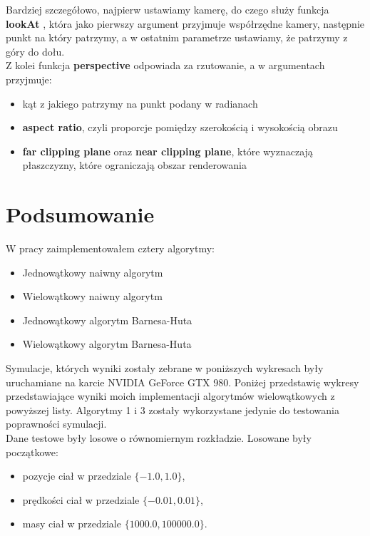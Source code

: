 \documentclass[14pt,twoside,a4paper]{article}
\theoremstyle{definition}
\begin{document}
Bardziej szczegółowo, najpierw ustawiamy kamerę, do czego służy funkcja \textbf{lookAt} \cite{opengl}, która jako pierwszy argument przyjmuje współrzędne kamery, następnie punkt na który patrzymy, a w ostatnim parametrze ustawiamy, że patrzymy z góry do dołu.\\
Z kolei funkcja \textbf{perspective} \cite{opengl} odpowiada za rzutowanie, a w argumentach przyjmuje:
\begin{itemize}
\item kąt z jakiego patrzymy na punkt podany w radianach
\item \textbf{aspect ratio}, czyli proporcje pomiędzy szerokością i wysokością obrazu
\item \textbf{far clipping plane} oraz \textbf{near clipping plane}, które wyznaczają płaszczyzny, które ograniczają obszar renderowania
\end{itemize} 

\newpage

\section{\LARGE Podsumowanie}

W pracy zaimplementowałem cztery algorytmy:
\begin{itemize}
\item Jednowątkowy naiwny algorytm 
\item Wielowątkowy naiwny algorytm 
\item Jednowątkowy algorytm Barnesa-Huta
\item Wielowątkowy algorytm Barnesa-Huta
\end{itemize}

Symulacje, których wyniki zostały zebrane w poniższych wykresach były uruchamiane na karcie NVIDIA GeForce GTX 980. Poniżej przedstawię wykresy przedstawiające wyniki moich implementacji algorytmów wielowątkowych z powyższej listy. Algorytmy 1 i 3 zostały wykorzystane jedynie do testowania poprawności symulacji. \\
Dane testowe były losowe o równomiernym rozkładzie. Losowane były początkowe:
\begin{itemize}
\item pozycje ciał w przedziale $\{-1.0, 1.0\}$,
\item prędkości ciał w przedziale $\{-0.01, 0.01\}$,
\item masy ciał w przedziale $\{1000.0, 100000.0\}$.
\end{itemize}
\end{document}
